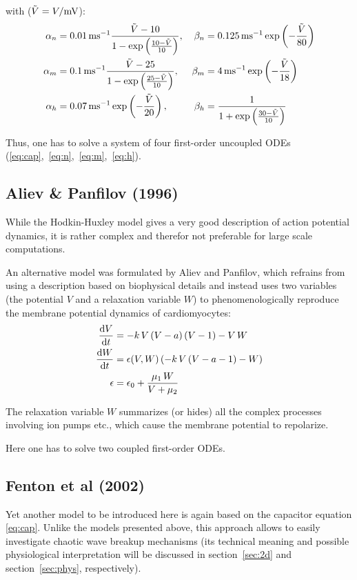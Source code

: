 with ($\tilde{V}=V/\si{\milli\volt}$):
\begin{align*}
    \alpha_{n}&=\SI{.01}{\per\milli\second}
        \frac{\tilde{V}-10}{1-
            \exp\left(\frac{10-\tilde{V}}{10}\right)},&
    \beta_{n}&=\SI{.125}{\per\milli\second}
        \exp\left(-\frac{\tilde{V}}{80}\right) \\
    \alpha_{m}&=\SI{.1}{\per\milli\second}
        \frac{\tilde{V}-25}{1-
            \exp\left(\frac{25-\tilde{V}}{10}\right)},&
    \beta_{m}&=\SI{4}{\per\milli\second}
        \exp\left(-\frac{\tilde{V}}{18}\right) \\
    \alpha_{h}&=\SI{.07}{\per\milli\second}
        \exp\left(-\frac{\tilde{V}}{20}\right),&
    \beta_{h}&=\frac{1}{1+
        \exp\left(\frac{30-\tilde{V}}{10}\right)}
\end{align*}

Thus, one has to solve a system of four first-order uncoupled ODEs
(\ref{eq:cap},~\ref{eq:n},~\ref{eq:m},~\ref{eq:h}).


\subsection{Aliev \& Panfilov (1996)}
While the Hodkin-Huxley model gives a very good description of
action potential dynamics, it is rather complex and therefor not preferable
for large scale computations.

An alternative model was formulated by Aliev and Panfilov, which refrains
from using a description based on biophysical details and instead uses two
variables (the potential $V$ and a relaxation variable $W$) to
phenomenologically reproduce the membrane potential dynamics of
cardiomyocytes:
\begin{subequations}
\begin{align}
    \dv{V}{t}&=-k\,V\,(V-a)\,(V-1)-V\,W \label{eq:ap_pot} \\
    \dv{W}{t}&=\epsilon(V, W)\,(-k\,V\,(V-a-1)-W) \label{eq:ap_relax} \\
    \epsilon&=\epsilon_0+\frac{\mu_1\,W}{V+\mu_2} \nonumber
\end{align}
\end{subequations}

The relaxation variable $W$ summarizes (or hides) all the complex processes
involving ion pumps etc., which cause the membrane potential to repolarize.

Here one has to solve two coupled first-order ODEs.

\subsection{Fenton et al (2002)}
Yet another model to be introduced here is again based on the capacitor
equation \eqref{eq:cap}. Unlike the models presented above, this approach
allows to easily investigate chaotic wave breakup mechanisms (its technical
meaning and possible physiological interpretation will be discussed in
section~\ref{sec:2d} and section~\ref{sec:phys}, respectively).

